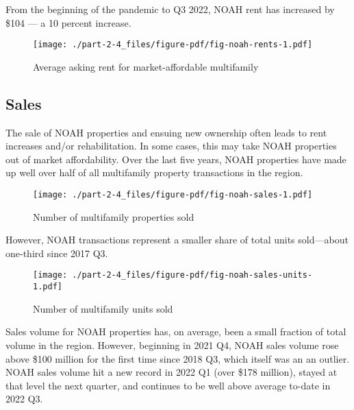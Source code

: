 \documentclass[
  letterpaper,
  DIV=11,
  numbers=noendperiod]{scrreprt}
\begin{document}
From the beginning of the pandemic to Q3 2022, NOAH rent has increased
by \$104 --- a 10 percent increase.

\begin{figure}

{\centering \texttt{[image: ./part-2-4\_files/figure-pdf/fig-noah-rents-1.pdf]}

}

\caption{\label{fig-noah-rents}Average asking rent for market-affordable
multifamily}

\end{figure}

\hypertarget{sales}{%
\subsection{Sales}\label{sales}}

The sale of NOAH properties and ensuing new ownership often leads to
rent increases and/or rehabilitation. In some cases, this may take NOAH
properties out of market affordability. Over the last five years, NOAH
properties have made up well over half of all multifamily property
transactions in the region.

\begin{figure}

{\centering \texttt{[image: ./part-2-4\_files/figure-pdf/fig-noah-sales-1.pdf]}

}

\caption{\label{fig-noah-sales}Number of multifamily properties sold}

\end{figure}

However, NOAH transactions represent a smaller share of total units
sold---about one-third since 2017 Q3.

\begin{figure}

{\centering \texttt{[image: ./part-2-4\_files/figure-pdf/fig-noah-sales-units-1.pdf]}

}

\caption{\label{fig-noah-sales-units}Number of multifamily units sold}

\end{figure}

Sales volume for NOAH properties has, on average, been a small fraction
of total volume in the region. However, beginning in 2021 Q4, NOAH sales
volume rose above \$100 million for the first time since 2018 Q3, which
itself was an an outlier. NOAH sales volume hit a new record in 2022 Q1
(over \$178 million), stayed at that level the next quarter, and
continues to be well above average to-date in 2022 Q3.
\end{document}
